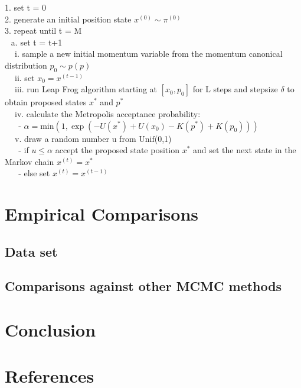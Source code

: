 \documentclass{article}
\begin{document}
1. set t = 0\\
2. generate an initial position state $x^{(0)} \sim \pi^{(0)}$\\
3. repeat until t = M\\
$~~$ a. set t = t+1\\
$~~~~$ i. sample a new initial momentum variable from the momentum canonical distribution $p_0 \sim p(p)$\\
$~~~~$ ii. set $x_0 = x^{(t-1)}$\\
$~~~~$ iii. run Leap Frog algorithm starting at $[x_0, p_0]$ for L steps and stepsize $\delta$ to obtain proposed states $x^*$ and $p^*$\\
$~~~~$ iv. calculate the Metropolis acceptance probability:\\
$~~~~~~$ - $\alpha = \text{min}(1,\exp(-U(x^*) + U(x_0) - K(p^*) + K(p_0)))$\\
$~~~~$ v. draw a random number u from $\text{Unif}$(0,1)\\
$~~~~~~$ - if $u \leq \alpha$ accept the proposed state position $x^*$ and set the next state in the Markov chain $x^{(t)}=x^*$\\
$~~~~~~$ - else set $x^{(t)} = x^{(t-1)}$\\

\section{Empirical Comparisons}
\subsection{Data set}
\subsection{Comparisons against other MCMC methods}

\section{Conclusion}

\section{References}
\end{document}
